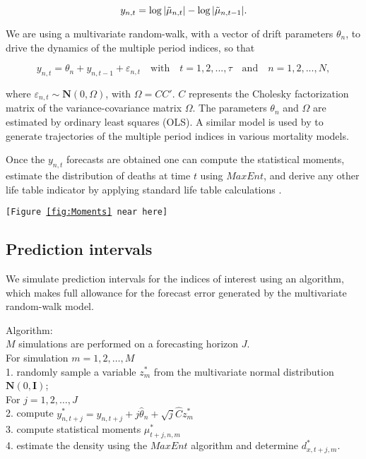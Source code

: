 \documentclass[T0_MEM]{subfiles}
\begin{document}
\begin{equation}
  y_{n,t} = \log{\lvert\tilde{\mu}_{n,t}\rvert} - \log{\lvert\tilde{\mu}_{n,t-1}\rvert}.
\end{equation}

We are using a multivariate random-walk, with a vector of drift parameters $\theta_n$, to drive the dynamics of the multiple period indices, so that

\begin{equation}
  y_{n,t} = \theta_n + y_{n,t-1} + \varepsilon_{n,t} \quad
  \textrm{with} \quad t = 1, 2, ..., \tau \quad
  \textrm{and} \quad n = 1, 2, ..., N,
\end{equation}

where $\varepsilon_{n,t} \sim \mathbf{N}(0, \Omega)$, with $\Omega = CC'$. $C$ represents the Cholesky factorization matrix of the variance-covariance matrix $\Omega$. The parameters $\theta_n$ and $\Omega$ are estimated by ordinary least squares (OLS). A similar model is used by \cite{haberman2011} to generate trajectories of the multiple period indices in various mortality models.

Once the $y_{n,t}$ forecasts are obtained one can compute the statistical moments, estimate the distribution of deaths at time $t$ using $MaxEnt$, and derive any other life table indicator by applying standard life table calculations \citep{preston2001}.

\begin{center}\texttt{[Figure \ref{fig:Moments} near here]}\end{center}


\subsection{Prediction intervals}\label{sec:PI}
We simulate prediction intervals for the indices of interest using an algorithm, which makes full allowance for the forecast error generated by the multivariate random-walk model.

Algorithm:\\
$M$ simulations are performed on a forecasting horizon $J$.\\
For simulation $m = 1, 2, \dots, M$\\
1. randomly sample a variable $z_{m}^{*}$ from the multivariate normal distribution $\mathbf{N}(0, \mathbf{I})$;\\
For $j = 1, 2, \dots, J$\\
2. compute $y_{n,t+j}^{*} = y_{n,t+j} + j\hat{\theta}_n + \sqrt{j}\hat{C}z_{m}^{*}$\\
3. compute statistical moments $\mu_{t+j, n, m}^{*}$\\
4. estimate the density using the $MaxEnt$ algorithm and determine $d_{x, t+j, m}^{*}$.
\end{document}
